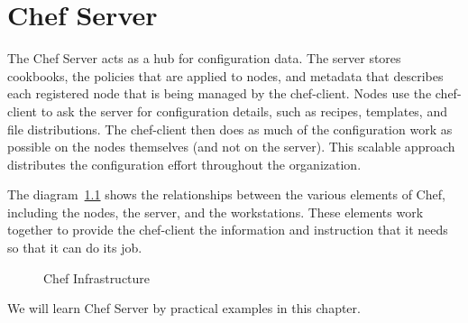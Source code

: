 \chapter{Chef Server}

The Chef Server acts as a hub for configuration data. The server stores cookbooks, the policies that are applied to nodes, and metadata that describes each registered node that is being managed by the chef-client. Nodes use the chef-client to ask the server for configuration details, such as recipes, templates, and file distributions. The chef-client then does as much of the configuration work as possible on the nodes themselves (and not on the server). This scalable approach distributes the configuration effort throughout the organization.

The diagram~\ref{fig:overview_chef_draft} shows the relationships between the various elements of Chef, including the nodes, the server, and the workstations. These elements work together to provide the chef-client the information and instruction that it needs so that it can do its job.

\begin{figure}[ht!]
  \caption{Chef Infrastructure}
  \label{fig:overview_chef_draft}
\end{figure}

We will learn Chef Server by practical examples in this chapter.







